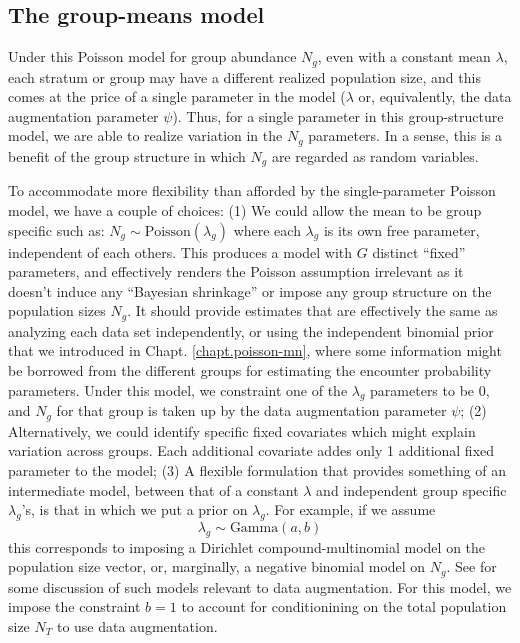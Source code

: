 \subsection{The group-means model}

Under this Poisson model for group abundance $N_g$, even with a
constant mean $\lambda$, each stratum or group may have a different
realized population size, and this comes at the price of a single
parameter in the model ($\lambda$ or, equivalently, the data
augmentation parameter $\psi$).  Thus, for a single parameter in this
group-structure model, we are able to realize variation in the $N_{g}$
parameters. In a sense, this is a benefit of the group structure in
which $N_{g}$ are regarded as random variables.

To accommodate more
flexibility than afforded by the single-parameter Poisson model, we
have a couple of choices: (1) We could allow the mean to be group specific such as:
$N_g \sim \mbox{Poisson}(\lambda_{g})$ where each $\lambda_{g}$ is its own
free parameter, independent of each others. This produces a model with
$G$ distinct ``fixed'' parameters, and effectively renders
the Poisson assumption irrelevant as it doesn't induce any
``Bayesian shrinkage'' \citep{sauer_link:2002}
or impose any group structure on the
population sizes $N_{g}$. It should provide estimates that are
effectively the same as analyzing each data set independently, or
using the independent binomial prior that we introduced in
Chapt. \ref{chapt.poisson-mn}, where some information might be
borrowed from the different groups for estimating the encounter
probability parameters.
Under this model, we constraint one of the $\lambda_{g}$ parameters
to be 0, and $N_{g}$ for that group is taken up by the data
augmentation parameter $\psi$; (2) Alternatively, we could identify
specific fixed covariates which might explain variation across
groups. Each additional covariate addes only 1 additional fixed
parameter to the model; (3)
A flexible formulation that provides something of an intermediate model,
between that of a constant $\lambda$ and independent group specific
$\lambda_{g}$'s, is that in which we put a prior on $\lambda_{g}$. For
example, if we assume
\[
 \lambda_{g} \sim \mbox{Gamma}(a,b)
\]
this corresponds to imposing a Dirichlet compound-multinomial
model on the population size vector, or, marginally, a negative
binomial model on $N_{g}$. See \citet{takemura:1999} for some
discussion of such models relevant to data augmentation.  For this
model, we impose the constraint $b=1$ to account for conditionining on
the total population size $N_{T}$ to use data augmentation.


